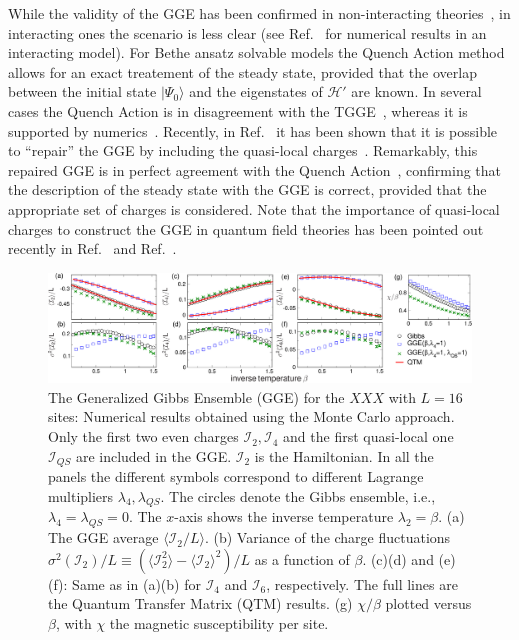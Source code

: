 \documentclass[twocolumn,superscriptaddress,prb,10pt]{revtex4-1}
\begin{document}
While the validity of the GGE has been confirmed in non-interacting 
theories~\cite{calabrese-2011,calabrese-2012,fagotti-2013,kcc14,kcc14a}, in interacting ones the 
scenario is less clear (see Ref.~ for numerical results in an 
interacting model). For Bethe ansatz solvable models the Quench Action 
method~\cite{caux-2013} allows for an exact treatement of the steady state, 
provided that the overlap between the initial state $|\Psi_0\rangle$ and the eigenstates 
of ${\mathcal H}'$ are known. In several cases the Quench Action is in disagreement with 
the TGGE~\cite{de-nardis-2014,pozsgay-2014,wouters-2014,mestyian-2015}, whereas it is 
supported by numerics~\cite{pozsgay-2014}. 
Recently, in Ref.~ it has been shown that it is possible to 
``repair''  the GGE by including the quasi-local charges~\cite{prosen-2014,
pereira-2014,ilievski-2015}. Remarkably, this repaired GGE is in 
perfect agreement with the Quench Action~\cite{ilievski-2015a}, confirming that 
the description of the steady state with the GGE is correct, provided that the 
appropriate set of charges is considered. Note that the 
importance of quasi-local charges to construct the GGE in quantum field 
theories has been pointed out recently in Ref.~ and 
Ref.~.

\begin{figure}[t]
\includegraphics*[width=0.93\linewidth]{fig1}
\caption{The Generalized Gibbs Ensemble (GGE) for the $XXX$ with 
 $L=16$ sites: Numerical results obtained using the Monte 
 Carlo approach. Only the first two even charges ${\mathcal I}_2,{\mathcal I}_4$ 
 and the first quasi-local one ${\mathcal I}_{QS}$ are included in the GGE. 
 ${\mathcal I}_2$ is the Hamiltonian. In all 
 the panels the different symbols correspond to different Lagrange multipliers 
 $\lambda_4,\lambda_{QS}$. The circles denote the Gibbs ensemble, i.e., 
 $\lambda_4=\lambda_{QS}=0$. The $x$-axis shows the inverse temperature  $\lambda_2=\beta$. 
 (a) The GGE average $\langle {\mathcal I}_2/L\rangle$. (b) Variance 
 of the charge fluctuations $\sigma^2({\mathcal I}_2)/L\equiv(\langle {\mathcal I}_2^2
 \rangle-\langle {\mathcal I}_2\rangle^2)/L$ as a function of $\beta$. (c)(d) and (e)(f): 
 Same as in (a)(b) for ${\mathcal I}_4$ and ${\mathcal I}_6$, respectively. The full lines  
 are the Quantum Transfer Matrix (QTM) results. 
 (g) $\chi/\beta$ plotted versus $\beta$, with 
 $\chi$ the magnetic susceptibility per site. 
}
\label{fig1}
\end{figure}
\end{document}
